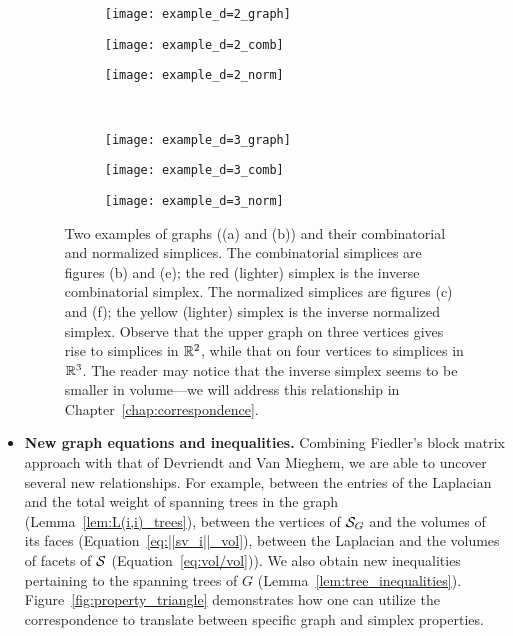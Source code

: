 \begin{itemize}
	\begin{figure}
		\centering
		\begin{subfigure}[b]{0.32\textwidth}
			\centering
			\texttt{[image: example\_d=2\_graph]}
			\vspace{0.2cm}
			\subcaption{}
		\end{subfigure}
		\begin{subfigure}[b]{0.32\textwidth}
			\centering
			\texttt{[image: example\_d=2\_comb]}
			\subcaption{}
		\end{subfigure}
		\begin{subfigure}[b]{0.32\textwidth}
			\centering
			\texttt{[image: example\_d=2\_norm]}
			\subcaption{}
		\end{subfigure}
		\\ 
		\begin{subfigure}[b]{0.32\textwidth}
			\centering
			\texttt{[image: example\_d=3\_graph]}
			\vspace{0.2cm}
			\subcaption{}
		\end{subfigure}
		\begin{subfigure}[b]{0.32\textwidth}
			\centering
			\texttt{[image: example\_d=3\_comb]}
			\subcaption{}
		\end{subfigure}
		\begin{subfigure}[b]{0.32\textwidth}
			\centering
			\texttt{[image: example\_d=3\_norm]}
			\subcaption{}
		\end{subfigure}
		\caption{Two examples of graphs ((a) and (b)) and their combinatorial and normalized simplices.  The combinatorial simplices are figures (b) and (e); the red (lighter) simplex is the inverse combinatorial simplex. The normalized simplices are figures (c) and (f); the yellow (lighter) simplex is the inverse normalized simplex. Observe that the upper graph on three vertices gives rise to simplices in $\mathbb{R}^2$, while that on  four vertices to simplices in $\mathbb{R}^3$. The reader may notice that the  inverse simplex seems to  be smaller in volume---we will address this relationship in Chapter~\ref{chap:correspondence}.   }
		\label{fig:correspondence_examples}
	\end{figure}
	
	
	
	\item {\bf New graph equations and inequalities.} 	Combining Fiedler's block matrix approach with that of Devriendt and Van Mieghem, we are able to uncover several new relationships. 
	For example, between the  entries of the Laplacian and the total  weight of spanning trees in  the graph (Lemma~\ref{lem:L(i,i)_trees}), between the vertices of $\mathcal{S}_G$  and the volumes of its faces (Equation~\eqref{eq:||sv_i||_vol}), between the Laplacian and the volumes of facets of $\mathcal{S}$ (Equation~\eqref{eq:vol/vol})). We also  obtain new inequalities pertaining to the spanning trees of $G$ (Lemma~\ref{lem:tree_inequalities}). Figure~\ref{fig:property_triangle}  demonstrates how one can utilize the correspondence to translate between specific graph and simplex properties. 
	

\end{itemize}
